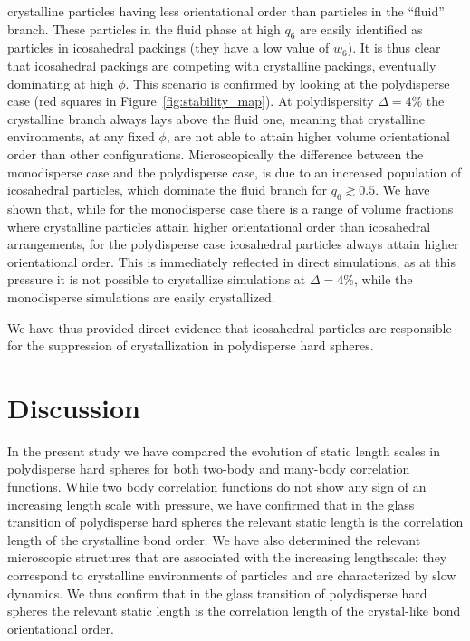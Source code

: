 \documentclass[twocolumn,superscriptaddress]{revtex4}
\begin{document}
crystalline particles having less orientational order than particles in the ``fluid'' branch.
These particles in the fluid phase at high $q_6$ are easily identified as particles in icosahedral packings (they have
a low value of $w_6$).
It is thus clear that icosahedral packings are competing with crystalline packings, eventually dominating
at high $\phi$. This scenario is confirmed by looking at the polydisperse case (red squares in
Figure~\ref{fig:stability_map}).
At polydispersity $\Delta=4\%$ the crystalline branch always lays above the fluid one, meaning that
crystalline environments, at any fixed $\phi$, are not able to attain higher volume orientational order than other configurations.
Microscopically the difference between the monodisperse case and the polydisperse case, is due to an increased population of icosahedral particles, which dominate the fluid branch for $q_6\gtrsim 0.5$.
We have shown that, while for the monodisperse case there is a range of volume fractions where crystalline particles
attain higher orientational order than icosahedral arrangements, for the polydisperse case icosahedral
particles always attain higher orientational order.
This is immediately reflected in direct simulations,
as at this pressure it is not possible to crystallize simulations at $\Delta=4\%$, while the
monodisperse simulations are easily crystallized.

We have thus provided direct evidence that icosahedral particles are responsible for the suppression
of crystallization in polydisperse hard spheres.

\section{Discussion}\label{sec:discussion}

In the present study we have compared the evolution of static length scales in polydisperse hard spheres
for both two-body and many-body correlation functions. While two body correlation functions do not
show any sign of an increasing length scale with pressure, we have confirmed that in the glass transition of polydisperse hard spheres the relevant static length is the correlation length of the crystalline bond order.
We have also determined the relevant microscopic structures that are associated with the increasing
lengthscale: they correspond to crystalline environments of particles and are characterized by slow
dynamics.
We thus confirm that in the glass transition of polydisperse hard spheres the relevant static length is the correlation length of the crystal-like bond orientational order.
\end{document}
